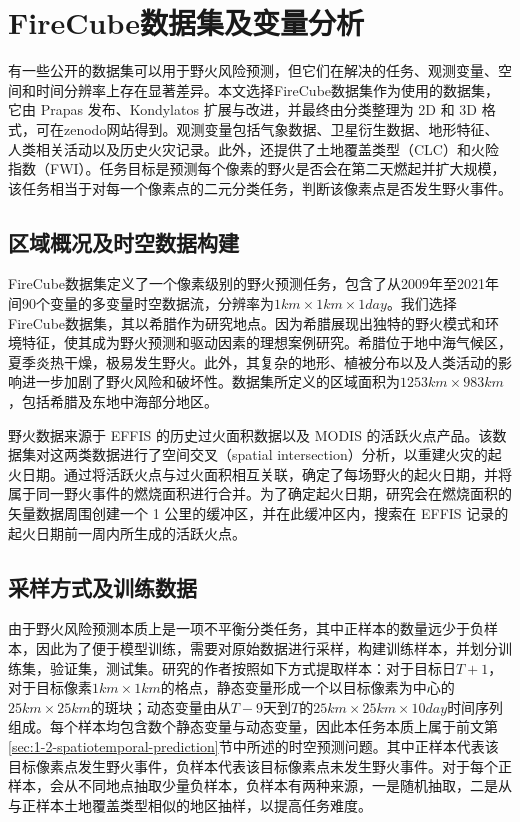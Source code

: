 \chapter{FireCube数据集及变量分析}
\label{chap:dataset}
有一些公开的数据集可以用于野火风险预测，但它们在解决的任务、观测变量、空间和时间分辨率上存在显著差异。本文选择FireCube数据集作为使用的数据集，它由 Prapas 发布\cite{prapas2021deep}、Kondylatos 扩展与改进\cite{kondylatos2022wildfire}，并最终由\textcite{prapas2022firecube}分类整理为 2D 和 3D 格式，可在zenodo网站\cite{prapas2022firecube_dataset}得到。观测变量包括气象数据、卫星衍生数据、地形特征、人类相关活动以及历史火灾记录。此外，还提供了土地覆盖类型（CLC）和火险指数（FWI）。任务目标是预测每个像素的野火是否会在第二天燃起并扩大规模，该任务相当于对每一个像素点的二元分类任务，判断该像素点是否发生野火事件。

\section{区域概况及时空数据构建}
\label{sec:regional-overview-and-spatio-temporal-data-construction}
FireCube数据集定义了一个像素级别的野火预测任务，包含了从2009年至2021年间90个变量的多变量时空数据流，分辨率为$1km\times 1km\times 1day$。我们选择FireCube数据集，其以希腊作为研究地点。因为希腊展现出独特的野火模式和环境特征，使其成为野火预测和驱动因素的理想案例研究。希腊位于地中海气候区，夏季炎热干燥，极易发生野火。此外，其复杂的地形、植被分布以及人类活动的影响进一步加剧了野火风险和破坏性。数据集所定义的区域面积为$1253km\times 983km$，包括希腊及东地中海部分地区。

野火数据来源于 EFFIS 的历史过火面积数据\cite{san2013european}以及 MODIS 的活跃火点产品\cite{giglio2016collection}。该数据集对这两类数据进行了空间交叉（spatial intersection）分析，以重建火灾的起火日期。通过将活跃火点与过火面积相互关联，确定了每场野火的起火日期，并将属于同一野火事件的燃烧面积进行合并。为了确定起火日期，研究会在燃烧面积的矢量数据周围创建一个 1 公里的缓冲区，并在此缓冲区内，搜索在 EFFIS 记录的起火日期前一周内所生成的活跃火点。

\section{采样方式及训练数据}
\label{sec:sampling-method-and-training-data}
由于野火风险预测本质上是一项不平衡分类任务，其中正样本的数量远少于负样本，因此为了便于模型训练，需要对原始数据进行采样，构建训练样本，并划分训练集，验证集，测试集。研究\cite{kondylatos2022wildfire}的作者按照如下方式提取样本：对于目标日$T+1$，对于目标像素$1km\times 1km$的格点，静态变量形成一个以目标像素为中心的$25km\times 25km$的斑块；动态变量由从$T-9$天到$T$的$25km\times 25km\times 10day$时间序列组成。每个样本均包含数个静态变量与动态变量，因此本任务本质上属于前文第\ref{sec:1-2-spatiotemporal-prediction}节中所述的时空预测问题。其中正样本代表该目标像素点发生野火事件，负样本代表该目标像素点未发生野火事件。对于每个正样本，会从不同地点抽取少量负样本，负样本有两种来源，一是随机抽取，二是从与正样本土地覆盖类型相似的地区抽样，以提高任务难度。

